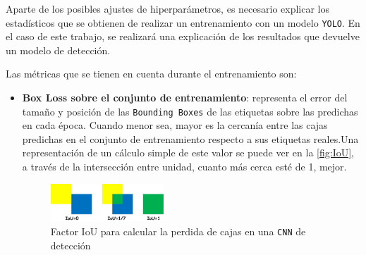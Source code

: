\clearpage
Aparte de los posibles ajustes de hiperparámetros, es necesario explicar los estadísticos que se obtienen de realizar un entrenamiento con un modelo \texttt{YOLO}. En el caso de este trabajo, se realizará una 
explicación de los resultados que devuelve un modelo de detección.

Las métricas que se tienen en cuenta durante el entrenamiento son:

\begin{itemize}
    \item \textbf{Box Loss sobre el conjunto de entrenamiento}: representa el error del tamaño y posición de las \texttt{Bounding Boxes} de las etiquetas sobre las predichas en cada época. Cuando menor sea, 
    mayor es la cercanía entre las cajas predichas en el conjunto de entrenamiento respecto a sus etiquetas reales.\newline Una representación de un cálculo simple de este valor se puede ver en la \autoref{fig:IoU}, a través de la 
    intersección entre unidad, cuanto más cerca esté de 1, mejor.

    \begin{figure}[H]
        \centering
        \includegraphics[width=0.4\textwidth]{images/13/a/IoU.png}
        \caption{Factor IoU para calcular la perdida de cajas en una \texttt{CNN} de detección}
        \label{fig:IoU}
    \end{figure}


\end{itemize}
